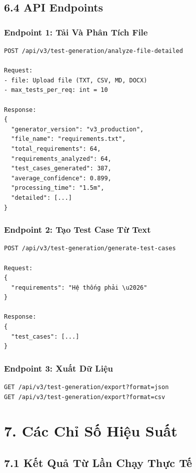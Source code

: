 \documentclass[14pt,a4paper]{article}
\begin{document}
\subsection{6.4 API Endpoints}

\subsubsection{Endpoint 1: Tải Và Phân Tích File}
\begin{verbatim}
POST /api/v3/test-generation/analyze-file-detailed

Request:
- file: Upload file (TXT, CSV, MD, DOCX)
- max_tests_per_req: int = 10

Response:
{
  "generator_version": "v3_production",
  "file_name": "requirements.txt",
  "total_requirements": 64,
  "requirements_analyzed": 64,
  "test_cases_generated": 387,
  "average_confidence": 0.899,
  "processing_time": "1.5m",
  "detailed": [...]
}
\end{verbatim}

\subsubsection{Endpoint 2: Tạo Test Case Từ Text}
\begin{verbatim}
POST /api/v3/test-generation/generate-test-cases

Request:
{
  "requirements": "Hệ thống phải \u2026"
}

Response:
{
  "test_cases": [...]
}
\end{verbatim}

\subsubsection{Endpoint 3: Xuất Dữ Liệu}
\begin{verbatim}
GET /api/v3/test-generation/export?format=json
GET /api/v3/test-generation/export?format=csv
\end{verbatim}

\section{7. Các Chỉ Số Hiệu Suất}

\subsection{7.1 Kết Quả Từ Lần Chạy Thực Tế}
\end{document}
